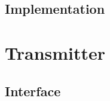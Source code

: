 \documentclass[]{article}
\begin{document}
  \subsection{Implementation} %
  \label{sub:veto_implementation}
  
  \section{Transmitter} %
  \label{sec:transmitter}
  
  \subsection{Interface} %
  \label{sub:tx_interface}
\end{document}
